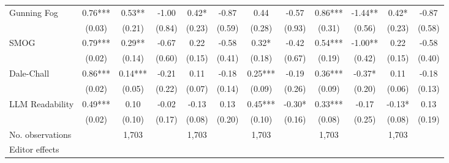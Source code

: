 \begin{table}
\begin{threeparttable}
\begin{tabular}{p{3cm}S@{}S@{}S@{}S@{}S@{}S@{}S@{}S@{}S@{}S@{}S@{}}
            Gunning Fog                   &        0.76***&        0.53** &       -1.00   &        0.42*  &       -0.87   &        0.44   &       -0.57   &        0.86***&       -1.44** &        0.42*  &       -0.87   \\
                                          &      (0.03)   &      (0.21)   &      (0.84)   &      (0.23)   &      (0.59)   &      (0.28)   &      (0.93)   &      (0.31)   &      (0.56)   &      (0.23)   &      (0.58)   \\
            SMOG                          &        0.79***&        0.29** &       -0.67   &        0.22   &       -0.58   &        0.32*  &       -0.42   &        0.54***&       -1.00** &        0.22   &       -0.58   \\
                                          &      (0.02)   &      (0.14)   &      (0.60)   &      (0.15)   &      (0.41)   &      (0.18)   &      (0.67)   &      (0.19)   &      (0.42)   &      (0.15)   &      (0.40)   \\
            Dale-Chall                    &        0.86***&        0.14***&       -0.21   &        0.11   &       -0.18   &        0.25***&       -0.19   &        0.36***&       -0.37*  &        0.11   &       -0.18   \\
                                          &      (0.02)   &      (0.05)   &      (0.22)   &      (0.07)   &      (0.14)   &      (0.09)   &      (0.26)   &      (0.09)   &      (0.20)   &      (0.06)   &      (0.13)   \\
            LLM Readability               &        0.49***&        0.10   &       -0.02   &       -0.13   &        0.13   &        0.45***&       -0.30*  &        0.33***&       -0.17   &       -0.13*  &        0.13   \\
                                          &      (0.02)   &      (0.10)   &      (0.17)   &      (0.08)   &      (0.20)   &      (0.10)   &      (0.16)   &      (0.08)   &      (0.25)   &      (0.08)   &      (0.19)   \\
            \midrule
            No. observations              &               &       1,703   &               &       1,703   &               &       1,703   &               &       1,703   &               &       1,703   &               \\
            \midrule
            Editor effects       &               &           {}   &               &           {}   &               &           {}   &               &           {}   &               &               &               \\

\end{tabular}
\end{threeparttable}
\end{table}
